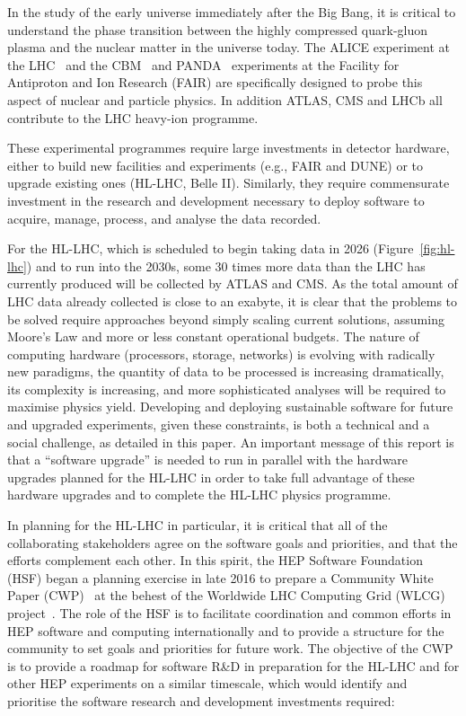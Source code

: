 \documentclass[twocolumn]{svjour3}          %
\begin{document}
In the study of the early universe immediately after the Big Bang, it is
critical to understand the phase transition between the highly
compressed quark-gluon plasma and the nuclear matter in the universe
today. The ALICE experiment at the LHC~\cite{ALICE} and
the CBM~\cite{CBM} and PANDA~\cite{PANDA} experiments at the Facility for Antiproton and Ion
Research (FAIR) are specifically designed to probe this aspect of
nuclear and particle physics. In addition ATLAS, CMS and LHCb all
contribute to the LHC heavy-ion programme.

These experimental programmes require large investments in detector
hardware, either to build new facilities and experiments (e.g., FAIR and DUNE) or to upgrade existing ones (HL-LHC, Belle II). Similarly, they
require commensurate investment in the research and development
necessary to deploy software to acquire, manage, process, and analyse
the data recorded.

For the HL-LHC, which is scheduled to begin taking data in 2026 (Figure~\ref{fig:hl-lhc}) and to run into the 2030s, some 30 times more data than
the LHC has currently produced will be collected by ATLAS and CMS. As
the total amount of LHC data already collected is close to an exabyte,
it is clear that the problems to be solved require approaches beyond
simply scaling current solutions, assuming Moore's Law and more or less
constant operational budgets. The nature of computing hardware
(processors, storage, networks) is evolving with radically new
paradigms, the quantity of data to be processed is increasing
dramatically, its complexity is increasing, and more sophisticated
analyses will be required to maximise physics yield. Developing and
deploying sustainable software for future and upgraded experiments,
given these constraints, is both a technical and a social challenge, as
detailed in this paper. An important message of this report is that a
``software upgrade'' is needed to run in parallel with the hardware
upgrades planned for the HL-LHC in order to take full advantage of these hardware upgrades and to complete the HL-LHC physics programme.

In planning for the HL-LHC in particular, it is critical that all of the
collaborating stakeholders agree on the software goals and priorities,
and that the efforts complement each other. In this spirit, the HEP
Software Foundation (HSF) began a planning exercise in late 2016 to
prepare a Community White Paper (CWP)~\cite{HSF2017} at the behest of the Worldwide LHC
Computing Grid (WLCG) project~\cite{WLCG2016}. The role of the HSF is to
facilitate coordination and common efforts in HEP software and computing
internationally and to provide a structure for the community to set
goals and priorities for future work. The objective of the CWP is to
provide a roadmap for software R\&D in preparation for the HL-LHC and
for other HEP experiments on a similar timescale, which would identify
and prioritise the software research and development investments
required:
\end{document}
